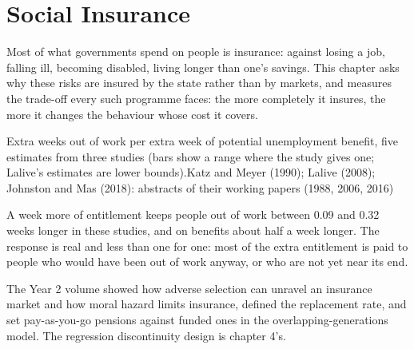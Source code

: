 \chapter{Social Insurance}\label{ch:b3:social-insurance}

Most of what governments spend on people is insurance: against losing a job,
falling ill, becoming disabled, living longer than one's savings. This chapter asks
why these risks are insured by the state rather than by markets, and measures the
trade-off every such programme faces: the more completely it insures, the more it
changes the behaviour whose cost it covers.

\begin{openingchart}{Extra weeks out of work per extra week of potential
unemployment benefit, five estimates from three studies (bars show a range where
the study gives one; Lalive's estimates are lower bounds).}{Katz and Meyer (1990);
Lalive (2008); Johnston and Mas (2018): abstracts of their working papers (1988,
2006, 2016)}
\end{openingchart}

A week more of entitlement keeps people out of work between 0.09 and 0.32 weeks
longer in these studies, and on benefits about half a week longer. The response is
real and less than one for one: most of the extra entitlement is paid to people who
would have been out of work anyway, or who are not yet near its end.

\begin{recall}
The Year 2 volume showed how adverse selection can unravel an insurance market
and how moral hazard limits insurance, defined the replacement rate, and set
pay-as-you-go pensions against funded ones in the overlapping-generations model.
The regression discontinuity design is chapter 4's.
\end{recall}

